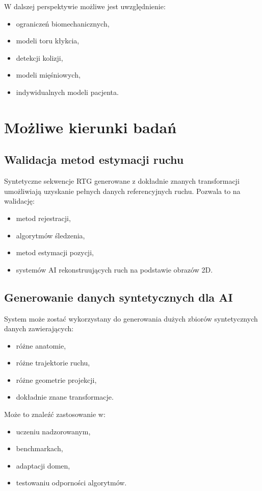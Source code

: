 \documentclass[11pt,a4paper]{article}
\begin{document}
W dalszej perspektywie możliwe jest uwzględnienie:
\begin{itemize}
\item ograniczeń biomechanicznych,
\item modeli toru kłykcia,
\item detekcji kolizji,
\item modeli mięśniowych,
\item indywidualnych modeli pacjenta.
\end{itemize}

\section{Możliwe kierunki badań}

\subsection{Walidacja metod estymacji ruchu}

Syntetyczne sekwencje RTG generowane z dokładnie znanych transformacji umożliwiają uzyskanie pełnych danych referencyjnych ruchu. Pozwala to na walidację:
\begin{itemize}
\item metod rejestracji,
\item algorytmów śledzenia,
\item metod estymacji pozycji,
\item systemów AI rekonstruujących ruch na podstawie obrazów 2D.
\end{itemize}

\subsection{Generowanie danych syntetycznych dla AI}

System może zostać wykorzystany do generowania dużych zbiorów syntetycznych danych zawierających:
\begin{itemize}
\item różne anatomie,
\item różne trajektorie ruchu,
\item różne geometrie projekcji,
\item dokładnie znane transformacje.
\end{itemize}

Może to znaleźć zastosowanie w:
\begin{itemize}
\item uczeniu nadzorowanym,
\item benchmarkach,
\item adaptacji domen,
\item testowaniu odporności algorytmów.
\end{itemize}
\end{document}
